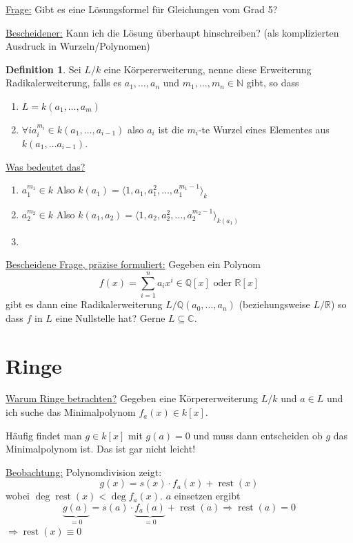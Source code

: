 \documentclass[12pt,parskip=full]{scrartcl}
\newcommand{\setN}{\mathbb{N}}
\newcommand{\setQ}{\mathbb{Q}}
\newcommand{\setR}{\mathbb{R}}
\newcommand{\setC}{\mathbb{C}}
\newcommand{\heading}{\underline}
\theoremstyle{definition}
\newtheorem{definition}[theorem]{Definition}
\theoremstyle{remark}
\begin{document}
	\heading{Frage:} Gibt es eine Lösungsformel für Gleichungen vom Grad 5?
	
	\heading{Bescheidener:} Kann ich die Lösung überhaupt hinschreiben? (als komplizierten Ausdruck in Wurzeln/Polynomen)
	
	\begin{definition}
		Sei $L/k$ eine Körpererweiterung, nenne diese Erweiterung Radikalerweiterung, falls es $a_1, \dots, a_n$ und $m_1, \dots, m_n \in \setN$ gibt, so dass
		\begin{enumerate}
			\item $L = k(a_1, \dots, a_m)$
			\item $\forall i a_i^{m_i} \in k(a_1, \dots, a_{i-1})$ also $a_i$ ist die $m_i$-te Wurzel eines Elementes aus $k(a_1, \dots a_{i-1})$.
		\end{enumerate}
	\end{definition}

	\heading{Was bedeutet das?}
	\begin{enumerate}
		\item $a_1^{m_1} \in k$ Also $k(a_1) = \langle 1 , a_1, a_1^2, \dots, a_1^{m_1 - 1} \rangle_k$
		\item $a_2^{m_2} \in k$ Also $k(a_1, a_2) = \langle 1 , a_2, a_2^2, \dots, a_2^{m_2 - 1} \rangle_{k(a_1)}$
		\item \textellipsis
	\end{enumerate}

	\heading{Bescheidene Frage, präzise formuliert:} Gegeben ein Polynom
	\begin{equation*}
		f(x) = \sum_{i=1}^{n} a_i x^i \in \setQ[x] \text{ oder } \setR[x]
	\end{equation*}
	gibt es dann eine Radikalerweiterung $L/\setQ(a_0, \dots, a_n)$ (beziehungsweise $L/\setR$) so dass $f$ in $L$ eine Nullstelle hat? Gerne $L \subseteq \setC$.
	
	\section{Ringe}
	
	\heading{Warum Ringe betrachten?} Gegeben eine Körpererweiterung $L/k$ und $a \in L$ und ich suche das Minimalpolynom $f_a(x) \in k[x]$.
	
	Häufig findet man $g \in k[x]$ mit $g(a) = 0$ und muss dann entscheiden ob $g$ das Minimalpolynom ist. Das ist gar nicht leicht!
	
	\heading{Beobachtung:} Polynomdivision zeigt:
	\begin{equation*}
		g(x) = s(x) \cdot f_a(x) + \operatorname{rest}(x)
	\end{equation*}
	wobei $\deg \operatorname{rest}(x) < \deg f_a(x)$. $a$ einsetzen ergibt
	\begin{equation*}
		\underbrace{g(a)}_{= 0} = s(a) \cdot \underbrace{f_a(a)}_{=0} + \operatorname{rest}(a) \Rightarrow \operatorname{rest}(a) = 0
 	\end{equation*}
 	$\Rightarrow \operatorname{rest}(x) \equiv 0$
 	
\end{document}
